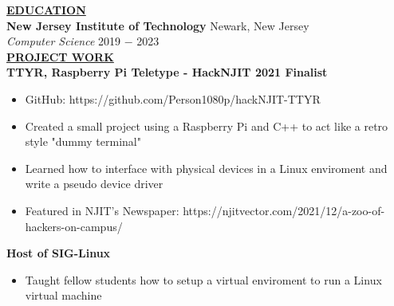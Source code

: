 \documentclass{article}
\begin{document}
\noindent \textbf{\underline{EDUCATION}} \\
\textbf{New Jersey Institute of Technology} \hfill Newark, New Jersey \\
\textit{Computer Science}  \hfill \hfill 2019 $-$ 2023 \\

%
%
\noindent \textbf{\underline{PROJECT WORK}} \\
\noindent \textbf{TTYR, Raspberry Pi Teletype - HackNJIT 2021 Finalist} 
\begin{itemize}[noitemsep,nolistsep,leftmargin=*]
\item {GitHub: https://github.com/Person1080p/hackNJIT-TTYR}
\item {Created a small project using a Raspberry Pi and C++ to act like a retro style "dummy terminal"}
\item {Learned how to interface with physical devices in a Linux enviroment and write a pseudo device driver}
\item {Featured in NJIT's Newspaper: https://njitvector.com/2021/12/a-zoo-of-hackers-on-campus/\\}
\end{itemize}

\noindent \textbf{Host of SIG-Linux} 
\begin{itemize}[noitemsep,nolistsep,leftmargin=*]
\item {Taught fellow students how to setup a virtual enviroment to run a Linux virtual machine}
\\
\end{itemize}
\end{document}
